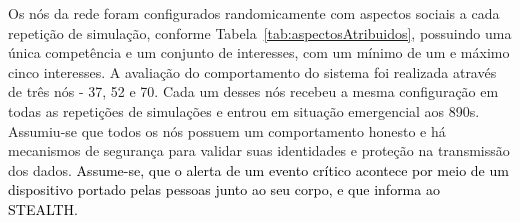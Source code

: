 \documentclass[12pt]{article}
\newcommand{\rev}[1]{\textcolor{black}{{#1}}}
\begin{document}
Os nós da rede foram configurados randomicamente com aspectos sociais a cada repetição de simulação, conforme Tabela~\ref{tab:aspectosAtribuidos}, possuindo uma única competência e um conjunto de interesses, com um mínimo de um e máximo cinco interesses.
A avaliação do comportamento do sistema foi realizada através de três nós - 37, 52 e 70. Cada um desses nós recebeu a mesma configuração em todas as repetições de simulações e entrou em situação emergencial aos 890s. Assumiu-se que todos os nós %
possuem 
um comportamento honesto e há mecanismos de segurança para validar suas identidades e proteção na transmissão dos dados. \rev{Assume-se, 
que o alerta de um evento crítico acontece por meio de um dispositivo portado pelas pessoas junto ao seu corpo, e que informa ao \mbox{STEALTH}.}

\end{document}
